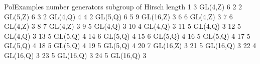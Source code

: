 \begintt
PolExamples      number generators      subgroup of      Hirsch length
          1                      3           GL(4,Z)                 6 
          2                      2           GL(5,Z)                 6 
          3                      2           GL(4,Q)                 4 
          4                      2           GL(5,Q)                 6 
          5                      9          GL(16,Z)                 3 
          6                      6           GL(4,Z)                 3
          7                      6           GL(4,Z)                 3
          8                      7           GL(4,Z)                 3 
          9                      5           GL(4,Q)                 3
         10                      4           GL(4,Q)                 3 
         11                      5           GL(4,Q)                 3
         12                      5           GL(4,Q)                 3 
         13                      5           GL(5,Q)                 4
         14                      6           GL(5,Q)                 4 
         15                      6           GL(5,Q)                 4 
         16                      5           GL(5,Q)                 4
         17                      5           GL(5,Q)                 4 
         18                      5           GL(5,Q)                 4
         19                      5           GL(5,Q)                 4 
         20                      7          GL(16,Z)                 3 
         21                      5          GL(16,Q)                 3 
         22                      4          GL(16,Q)                 3
         23                      5          GL(16,Q)                 3 
         24                      5          GL(16,Q)                 3 

\endtt














